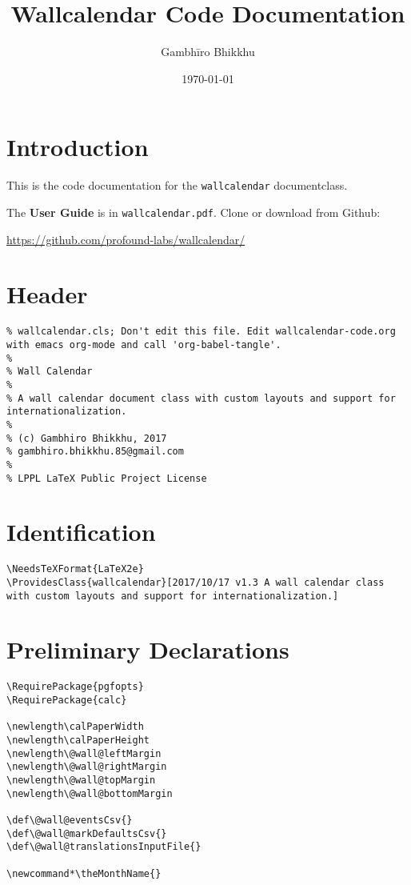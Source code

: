 \documentclass[11pt,oneside]{memoir-article}
\author{Gambhīro Bhikkhu}
\date{\today}
\title{Wallcalendar Code Documentation}
\begin{document}
\maketitle

\chapter{Introduction}
\label{sec:org96389a7}

\bigskip

This is the code documentation for the \texttt{wallcalendar} documentclass.

The \textbf{User Guide} is in \texttt{wallcalendar.pdf}. Clone or download from Github:

\href{https://github.com/profound-labs/wallcalendar/}{https://github.com/profound-labs/wallcalendar/}

\bigskip

\tableofcontents*

\clearpage

\chapter{Header}
\label{sec:org45bc02b}

\begin{verbatim}
% wallcalendar.cls; Don't edit this file. Edit wallcalendar-code.org with emacs org-mode and call 'org-babel-tangle'.
%
% Wall Calendar
%
% A wall calendar document class with custom layouts and support for internationalization.
%
% (c) Gambhiro Bhikkhu, 2017
% gambhiro.bhikkhu.85@gmail.com
%
% LPPL LaTeX Public Project License
\end{verbatim}

\chapter{Identification}
\label{sec:org29781fd}

\begin{verbatim}
\NeedsTeXFormat{LaTeX2e}
\ProvidesClass{wallcalendar}[2017/10/17 v1.3 A wall calendar class with custom layouts and support for internationalization.]
\end{verbatim}

\chapter{Preliminary Declarations}
\label{sec:org2ebd68a}

\begin{verbatim}
\RequirePackage{pgfopts}
\RequirePackage{calc}

\newlength\calPaperWidth
\newlength\calPaperHeight
\newlength\@wall@leftMargin
\newlength\@wall@rightMargin
\newlength\@wall@topMargin
\newlength\@wall@bottomMargin

\def\@wall@eventsCsv{}
\def\@wall@markDefaultsCsv{}
\def\@wall@translationsInputFile{}

\newcommand*\theMonthName{}
\end{verbatim}
\end{document}
